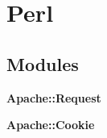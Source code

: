 \section{Perl}
\label{group__XS}
\subsection*{Modules}
\begin{CompactItemize}
\item 
{\bf Apache::Request}
\item 
{\bf Apache::Cookie}
\end{CompactItemize}
